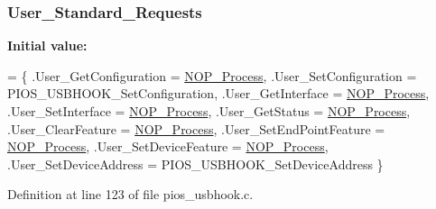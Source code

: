\hypertarget{group___p_i_o_s___u_s_b_h_o_o_k_ga8d70d0a7e05cf9c172e4304def6b65b8}{
\subsubsection[{User\-\_\-\-Standard\-\_\-\-Requests}]{ User\-\_\-\-Standard\-\_\-\-Requests}}\label{group___p_i_o_s___u_s_b_h_o_o_k_ga8d70d0a7e05cf9c172e4304def6b65b8}
{\bfseries Initial value\-:}
\begin{DoxyCode}
= \{
        .User\_GetConfiguration   = \hyperlink{_s_t_m32_f10x_2_libraries_2_s_t_m32___u_s_b-_f_s-_device___driver_2inc_2usb__core_8h_a5576d2ea5bf87fec71925b8e20048e74}{NOP\_Process},
        .User\_SetConfiguration   = PIOS\_USBHOOK\_SetConfiguration,
        .User\_GetInterface       = \hyperlink{_s_t_m32_f10x_2_libraries_2_s_t_m32___u_s_b-_f_s-_device___driver_2inc_2usb__core_8h_a5576d2ea5bf87fec71925b8e20048e74}{NOP\_Process},
        .User\_SetInterface       = \hyperlink{_s_t_m32_f10x_2_libraries_2_s_t_m32___u_s_b-_f_s-_device___driver_2inc_2usb__core_8h_a5576d2ea5bf87fec71925b8e20048e74}{NOP\_Process},
        .User\_GetStatus          = \hyperlink{_s_t_m32_f10x_2_libraries_2_s_t_m32___u_s_b-_f_s-_device___driver_2inc_2usb__core_8h_a5576d2ea5bf87fec71925b8e20048e74}{NOP\_Process},
        .User\_ClearFeature       = \hyperlink{_s_t_m32_f10x_2_libraries_2_s_t_m32___u_s_b-_f_s-_device___driver_2inc_2usb__core_8h_a5576d2ea5bf87fec71925b8e20048e74}{NOP\_Process},
        .User\_SetEndPointFeature = \hyperlink{_s_t_m32_f10x_2_libraries_2_s_t_m32___u_s_b-_f_s-_device___driver_2inc_2usb__core_8h_a5576d2ea5bf87fec71925b8e20048e74}{NOP\_Process},
        .User\_SetDeviceFeature   = \hyperlink{_s_t_m32_f10x_2_libraries_2_s_t_m32___u_s_b-_f_s-_device___driver_2inc_2usb__core_8h_a5576d2ea5bf87fec71925b8e20048e74}{NOP\_Process},
        .User\_SetDeviceAddress   = PIOS\_USBHOOK\_SetDeviceAddress
\}
\end{DoxyCode}


Definition at line 123 of file pios\-\_\-usbhook.\-c.

